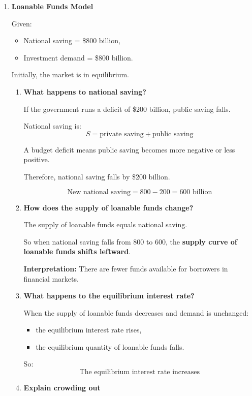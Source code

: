 \documentclass[12pt]{article}
\begin{document}
\begin{enumerate}[label=\textbf{\arabic*.}, start=4]

\item \textbf{Loanable Funds Model}

Given:
\begin{itemize}
    \item National saving = \$800 billion,
    \item Investment demand = \$800 billion.
\end{itemize}

Initially, the market is in equilibrium.

\begin{enumerate}
    \item[(a)] \textbf{What happens to national saving?}

If the government runs a deficit of \$200 billion, public saving falls.

National saving is:
\[
S = \text{private saving} + \text{public saving}
\]

A budget deficit means public saving becomes more negative or less positive.

Therefore, national saving falls by \$200 billion.

\[
\boxed{\text{New national saving} = 800 - 200 = 600 \text{ billion}}
\]

\item[(b)] \textbf{How does the supply of loanable funds change?}

The supply of loanable funds equals national saving.

So when national saving falls from 800 to 600, the \textbf{supply curve of loanable funds shifts leftward}.

\textbf{Interpretation:} There are fewer funds available for borrowers in financial markets.

\item[(c)] \textbf{What happens to the equilibrium interest rate?}

When the supply of loanable funds decreases and demand is unchanged:
\begin{itemize}
    \item the equilibrium interest rate rises,
    \item the equilibrium quantity of loanable funds falls.
\end{itemize}

So:
\[
\boxed{\text{The equilibrium interest rate increases}}
\]

\item[(d)] \textbf{Explain crowding out}


\end{enumerate}
\end{enumerate}
\end{document}
